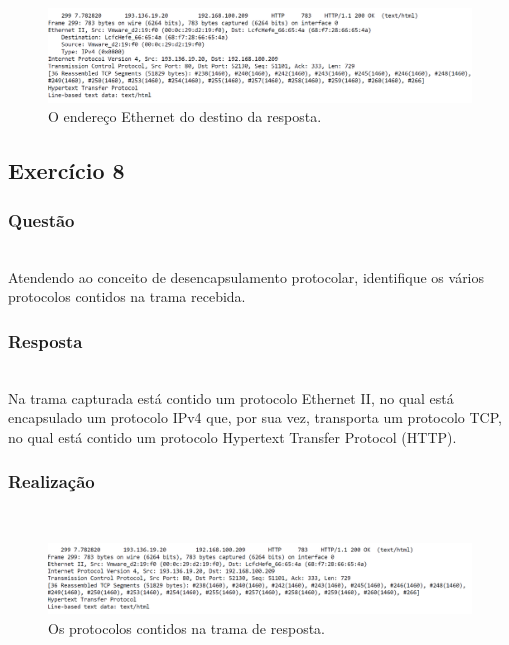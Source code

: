 \documentclass{llncs}
\begin{document}
\begin{figure}
  \begin{center}
  \includegraphics[scale=0.35]{imagens/HTTPresponse.png} 
  \end{center}
  \caption{O endereço Ethernet do destino da resposta.}
  \label{fig:ethernet_response_dest}
\end{figure}

\clearpage
\subsection{Exercício 8}
\subsubsection{Questão}\rule[-10pt]{0pt}{10pt}\\

Atendendo ao conceito de desencapsulamento protocolar, identifique os vários protocolos contidos na trama recebida.

\subsubsection{Resposta}\rule[-10pt]{0pt}{10pt}\\

Na trama capturada está contido um protocolo Ethernet II, no qual está encapsulado um protocolo IPv4 que, por sua vez, transporta um protocolo TCP, no qual está contido um protocolo Hypertext Transfer Protocol (HTTP).

\subsubsection{Realização}\rule[-10pt]{0pt}{10pt}\\

\begin{figure}
  \begin{center}
  \includegraphics[scale=0.35]{imagens/fields.png} 
  \end{center}
  \caption{Os protocolos contidos na trama de resposta.}
  \label{fig:response_fields}
\end{figure}
\end{document}
